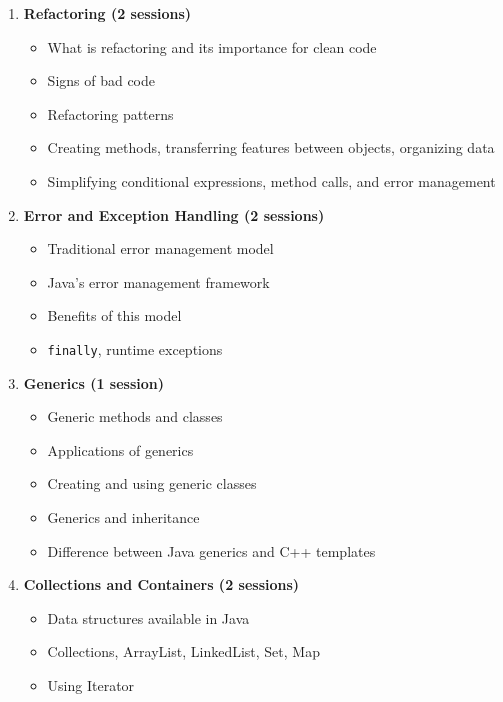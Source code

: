 \documentclass[12pt]{article}
\begin{document}
\begin{enumerate}
    \item \textbf{Refactoring (2 sessions)}
        \begin{itemize}
            \item What is refactoring and its importance for clean code
            \item Signs of bad code
            \item Refactoring patterns
            \item Creating methods, transferring features between objects, organizing data
            \item Simplifying conditional expressions, method calls, and error management
        \end{itemize}
    
    \item \textbf{Error and Exception Handling (2 sessions)}
        \begin{itemize}
            \item Traditional error management model
            \item Java's error management framework
            \item Benefits of this model
            \item \texttt{finally}, runtime exceptions
        \end{itemize}
    
    \item \textbf{Generics (1 session)}
        \begin{itemize}
            \item Generic methods and classes
            \item Applications of generics
            \item Creating and using generic classes
            \item Generics and inheritance
            \item Difference between Java generics and C++ templates
        \end{itemize}
    
    \item \textbf{Collections and Containers (2 sessions)}
        \begin{itemize}
            \item Data structures available in Java
            \item Collections, ArrayList, LinkedList, Set, Map
            \item Using Iterator
        \end{itemize}
    

\end{enumerate}
\end{document}
